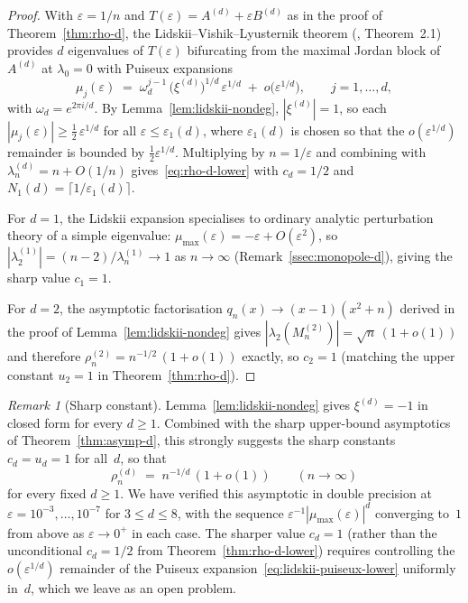 \documentclass{amsart}
\theoremstyle{definition}
\theoremstyle{remark}
\newtheorem{remark}[theorem]{Remark}
\begin{document}
\begin{proof}
With $\varepsilon = 1/n$ and $T(\varepsilon) = A^{(d)} +
\varepsilon B^{(d)}$ as in the proof of
Theorem~\ref{thm:rho-d}, the
Lidskii--Vishik--Lyusternik theorem
(\cite{moro-burke-overton-1997}, Theorem~2.1) provides $d$
eigenvalues of $T(\varepsilon)$ bifurcating from the maximal
Jordan block of $A^{(d)}$ at $\lambda_0 = 0$ with Puiseux
expansions
\begin{equation}\label{eq:lidskii-puiseux-lower}
  \mu_j(\varepsilon)
  \;=\; \omega_d^{j-1}\, \bigl(\xi^{(d)}\bigr)^{1/d}\,
    \varepsilon^{1/d}
    \;+\; o\bigl(\varepsilon^{1/d}\bigr),
  \qquad j = 1, \ldots, d,
\end{equation}
with $\omega_d = e^{2\pi i/d}$.  By
Lemma~\ref{lem:lidskii-nondeg}, $|\xi^{(d)}| = 1$, so each
$|\mu_j(\varepsilon)| \ge \tfrac{1}{2}\, \varepsilon^{1/d}$ for
all $\varepsilon \le \varepsilon_1(d)$, where
$\varepsilon_1(d)$ is chosen so that the
$o(\varepsilon^{1/d})$ remainder is bounded by
$\tfrac{1}{2} \varepsilon^{1/d}$.  Multiplying by $n =
1/\varepsilon$ and combining with $\lambda_n^{(d)} = n + O(1/n)$
gives~\eqref{eq:rho-d-lower} with $c_d = 1/2$ and $N_1(d) =
\lceil 1/\varepsilon_1(d) \rceil$.

For $d = 1$, the Lidskii expansion specialises to ordinary
analytic perturbation theory of a simple eigenvalue:
$\mu_{\max}(\varepsilon) = -\varepsilon + O(\varepsilon^2)$, so
$|\lambda_2^{(1)}| = (n - 2)/\lambda_n^{(1)} \to 1$ as $n \to
\infty$ (Remark~\ref{ssec:monopole-d}), giving the sharp value
$c_1 = 1$.

For $d = 2$, the asymptotic factorisation $q_n(x) \to (x - 1)(x^2
+ n)$ derived in the proof of Lemma~\ref{lem:lidskii-nondeg}
gives $|\lambda_2(M_n^{(2)})| = \sqrt{n}\, (1 + o(1))$ and
therefore $\rho_n^{(2)} = n^{-1/2}\, (1 + o(1))$ exactly, so
$c_2 = 1$ (matching the upper constant $u_2 = 1$ in
Theorem~\ref{thm:rho-d}).
\end{proof}

\begin{remark}[Sharp constant]
\label{rem:c_d-numeric}
Lemma~\ref{lem:lidskii-nondeg} gives $\xi^{(d)} = -1$ in closed
form for every $d \ge 1$.  Combined with the sharp upper-bound
asymptotics of Theorem~\ref{thm:asymp-d}, this strongly suggests
the sharp constants $c_d = u_d = 1$ for all~$d$, so that
\[
  \rho_n^{(d)} \;=\; n^{-1/d}\, (1 + o(1))
  \qquad (n \to \infty)
\]
for every fixed $d \ge 1$.  We have verified this asymptotic in
double precision at $\varepsilon = 10^{-3}, \ldots, 10^{-7}$
for $3 \le d \le 8$, with the sequence $\varepsilon^{-1}
|\mu_{\max}(\varepsilon)|^d$ converging to~$1$ from above as
$\varepsilon \to 0^+$ in each case.  The sharper value $c_d = 1$
(rather than the unconditional $c_d = 1/2$ from
Theorem~\ref{thm:rho-d-lower}) requires controlling the
$o(\varepsilon^{1/d})$ remainder of the Puiseux
expansion~\eqref{eq:lidskii-puiseux-lower} uniformly in~$d$,
which we leave as an open problem.
\end{remark}
\end{document}
